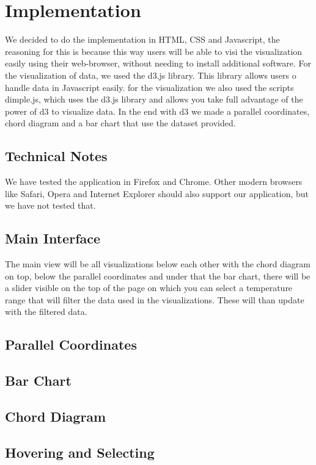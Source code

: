 \documentclass[a4paper,twoside,11pt]{article}
\begin{document}
\section{Implementation}
We decided to do the implementation in HTML, CSS and Javascript, the reasoning for this is because this way users will be able to visi the visualization easily using their web-browser, without needing to install additional software. \newline
For the visualization of data, we used the d3.js library. This library allows users o handle data in Javascript easily. for the visualization we also used the scripts dimple.js, which uses the d3.js library and allows you take full advantage of the power of d3 to visualize data. In the end with d3 we made a parallel coordinates, chord diagram and a bar chart that use the dataset provided.
\subsection{Technical Notes}
We have tested the application in Firefox and Chrome. Other modern browsers like Safari, Opera and Internet Explorer should also support our application, but we have not tested that.
\subsection{Main Interface}
The main view will be all visualizations below each other with the chord diagram on top, below the parallel coordinates and under that the bar chart, there will be a slider visible on the top of the page on which you can select a temperature range that will filter the data used in the visualizations. These will than update with the filtered data.
\subsection{Parallel Coordinates}

\subsection{Bar Chart}

\subsection{Chord Diagram}

\subsection{Hovering and Selecting}
\end{document}
